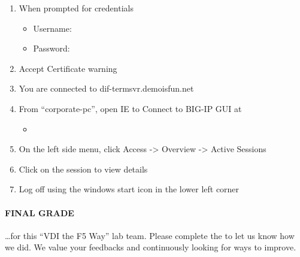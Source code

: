 \documentclass[letterpaper,10pt,english]{sphinxmanual}
\def\backcoverpage{
  \newpage
  \thispagestyle{empty}
  \phantom{100}
  \ThisURCornerWallPaper{1.0}{back_cover}
}
\begin{document}
\begin{enumerate}
\begin{itemize}
\end{itemize}

\item {} 
When prompted for credentials
\begin{itemize}
\item {} 
Username: 

\item {} 
Password: 

\end{itemize}

\item {} 
Accept Certificate warning


\item {} 
You are connected to dif-termsvr.demoisfun.net

\item {} 
From “corporate-pc”, open IE to Connect to BIG-IP GUI at
\begin{itemize}
\item {} 

\end{itemize}

\item {} 
On the left side menu, click Access -\textgreater{} Overview -\textgreater{} Active Sessions

\item {} 
Click on the session to view details


\item {} 
Log off using the windows start icon in the lower left corner

\end{enumerate}


\paragraph{FINAL GRADE}
\label{\detokenize{class2/module3/lab1:final-grade}}
…for this “VDI the F5 Way” lab team. Please complete the  to
let us know how we did. We value your feedbacks and continuously looking
for ways to improve.




\renewcommand{\indexname}{Index}

\backcoverpage
\end{document}
